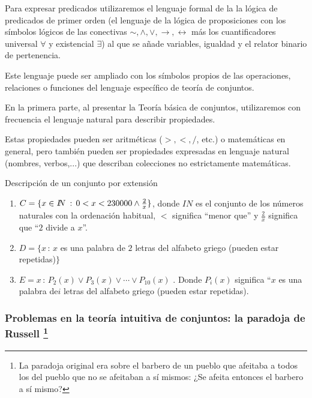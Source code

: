 \begin{lista}
Para expresar predicados utilizaremos el lenguaje formal de la la
lógica de predicados de primer orden (el lenguaje de la lógica de
proposiciones con los símbolos lógicos de las conectivas $\sim,\wedge,\vee,\rightarrow,\leftrightarrow$
más los cuantificadores universal $\forall$ y existencial $\exists$)
al que se añade variables, igualdad y el relator binario de pertenencia.

Este lenguaje puede ser ampliado con los símbolos propios de las operaciones,
relaciones o funciones del lenguaje específico de teoría de conjuntos.

En la primera parte, al presentar la Teoría básica de conjuntos, utilizaremos
con frecuencia el lenguaje natural para describir propiedades.

Estas propiedades pueden ser aritméticas ($>,<,/$, etc.) o matemáticas
en general, pero también pueden ser propiedades expresadas en lenguaje
natural (nombres, verbos,...) que describan colecciones no estrictamente
matemáticas.

\begin{ejemplo}{Descripción de un conjunto por extensión}\begin{enumerate} 

\item $C=\{x\in I\!\!N\::\text{\,}0<x<230000\wedge\frac{2}{x}\}$,
donde $I\!\!N$ es el conjunto de los números naturales con la ordenación
habitual, $<$ significa “menor que” y $\frac{2}{x}$ significa que
“$2$ divide a $x$”. 

\item $D=\{x\,:\,x$ es una palabra de $2$ letras del alfabeto griego
(pueden estar repetidas)$\}$

\item $E={x\,:\,P_{2}(x)\vee P_{3}(x)\vee\cdots\vee P_{10}(x)}$
. Donde $P_{i}(x)$ significa “$x$ es una palabra de$i$ letras del
alfabeto griego (pueden estar repetidas).\end{enumerate}\end{ejemplo}
\end{lista}

\subsubsection{Problemas en la teoría intuitiva de conjuntos: la paradoja de Russell
\protect\footnote{La paradoja original era sobre el barbero de un pueblo que afeitaba
a todos los del pueblo que no se afeitaban a sí mismos: ¿Se afeita
entonces el barbero a sí mismo? }}

